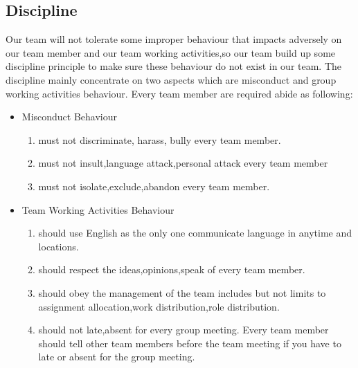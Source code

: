 \documentclass[11pt]{article}
\begin{document}
\subsection{Discipline}
Our team will not tolerate some improper behaviour that impacts adversely on our team member and our team working activities,so our team build up some discipline principle to make sure these behaviour do not exist in our team. The discipline mainly concentrate on two aspects which are misconduct and group working activities behaviour. Every team member are required abide as following: 

	\begin{itemize}
		\item Misconduct Behaviour
		\begin{enumerate}
			\item must not discriminate, harass, bully every team member.
		\item must not insult,language attack,personal attack every team member
		\item must not isolate,exclude,abandon every team member.
	\end{enumerate}
\item Team Working Activities Behaviour
	\begin{enumerate}
	\item should use English as the only one communicate language in anytime and locations.
	\item should respect the ideas,opinions,speak of every team member.
	\item should obey the management of the team includes but not limits to assignment allocation,work distribution,role distribution.  
		\item should not late,absent for every group meeting. Every team member should tell other team members before the team meeting if you have to late or absent for the group meeting.
\end{enumerate}
	\end{itemize}
\par\setlength\parindent{2em}
\end{document}
